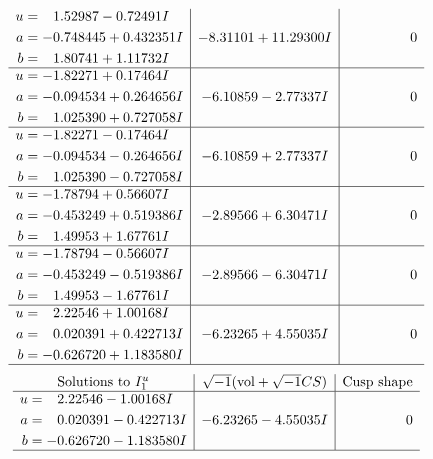 \documentclass[1p]{elsarticle_modified}
\theoremstyle{definition}
\newcommand{\I}{\sqrt{-1}}
\begin{document}
$$\begin{array}{c|c|c}
\begin{aligned}
u &= \phantom{-}1.52987 - 0.72491 I \\
a &= -0.748445 + 0.432351 I \\
b &= \phantom{-}1.80741 + 1.11732 I\end{aligned}
 & -8.31101 + 11.29300 I & \phantom{-0.000000 } 0 \\ \hline\begin{aligned}
u &= -1.82271 + 0.17464 I \\
a &= -0.094534 + 0.264656 I \\
b &= \phantom{-}1.025390 + 0.727058 I\end{aligned}
 & -6.10859 - 2.77337 I & \phantom{-0.000000 } 0 \\ \hline\begin{aligned}
u &= -1.82271 - 0.17464 I \\
a &= -0.094534 - 0.264656 I \\
b &= \phantom{-}1.025390 - 0.727058 I\end{aligned}
 & -6.10859 + 2.77337 I & \phantom{-0.000000 } 0 \\ \hline\begin{aligned}
u &= -1.78794 + 0.56607 I \\
a &= -0.453249 + 0.519386 I \\
b &= \phantom{-}1.49953 + 1.67761 I\end{aligned}
 & -2.89566 + 6.30471 I & \phantom{-0.000000 } 0 \\ \hline\begin{aligned}
u &= -1.78794 - 0.56607 I \\
a &= -0.453249 - 0.519386 I \\
b &= \phantom{-}1.49953 - 1.67761 I\end{aligned}
 & -2.89566 - 6.30471 I & \phantom{-0.000000 } 0 \\ \hline\begin{aligned}
u &= \phantom{-}2.22546 + 1.00168 I \\
a &= \phantom{-}0.020391 + 0.422713 I \\
b &= -0.626720 + 1.183580 I\end{aligned}
 & -6.23265 + 4.55035 I & \phantom{-0.000000 } 0\\
 \hline 
 \end{array}$$\newpage$$\begin{array}{c|c|c}  
\text{Solutions to }I^u_{1}& \I (\text{vol} + \sqrt{-1}CS) & \text{Cusp shape}\\
 \hline 
\begin{aligned}
u &= \phantom{-}2.22546 - 1.00168 I \\
a &= \phantom{-}0.020391 - 0.422713 I \\
b &= -0.626720 - 1.183580 I\end{aligned}
 & -6.23265 - 4.55035 I & \phantom{-0.000000 } 0\\
 \hline 
 \end{array}$$\newpage\newpage\renewcommand{\arraystretch}{1}
\end{document}
